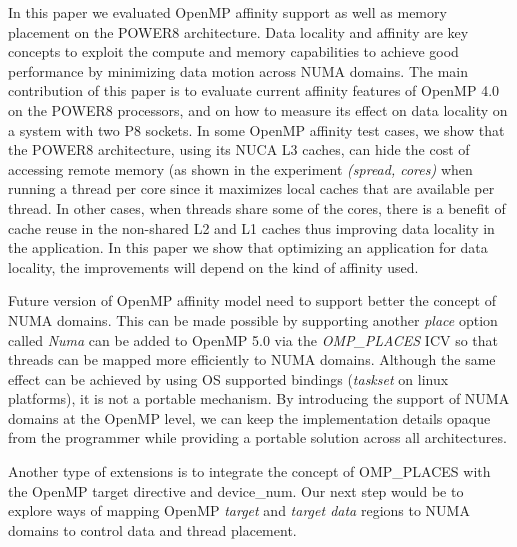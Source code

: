 In this paper we evaluated OpenMP affinity support as well as memory placement on the POWER8 architecture. 
Data locality and affinity are key concepts to exploit the compute and memory capabilities to achieve good performance by minimizing data motion across NUMA domains. 
The main contribution of this paper is to evaluate current affinity features of OpenMP 4.0 on the POWER8 processors, and on how to measure its effect on data locality on a system with two P8 sockets. 
In some OpenMP affinity test cases, we show that the POWER8 architecture, using its NUCA L3 caches, can hide the cost of accessing remote memory (as shown in the experiment \textit{(spread, cores)} when running a thread per core since it maximizes local caches that are available per thread. 
In other cases, when threads share some of the cores, there is a benefit of cache reuse in the non-shared L2 and L1 caches thus improving data locality in the application.
 In this paper we show that optimizing an application for data locality, the improvements will depend on the kind of affinity used. 

Future version of OpenMP affinity model need to support better the concept of NUMA domains. 
This can be made possible by supporting another \textit{place} option called \textit{Numa} can be added to OpenMP 5.0 via the \emph{OMP\_PLACES} ICV so that threads can be mapped more efficiently to NUMA domains. Although the same effect can be achieved by using OS supported bindings (\textit{taskset} on linux platforms), it is not a portable mechanism. By introducing the support of NUMA domains at the OpenMP level, we can keep the implementation details opaque from the programmer while providing a portable solution across all architectures.

Another type of extensions is to integrate the concept of OMP\_PLACES with the OpenMP target directive and device\_num. Our next step would be to explore ways of mapping OpenMP \emph{target} and \emph{target data} 
regions to NUMA domains to control data and thread placement.
